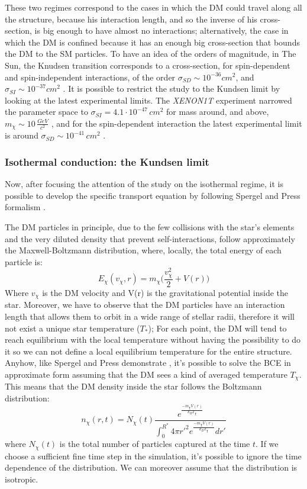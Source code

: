 These two regimes correspond to the cases in which the DM could travel along all the structure, because his interaction length, and so the inverse of his cross-section,  is big enough to have almost no interactions; alternatively, the case in which the DM is confined because it has an enough big cross-section that bounds the DM to the SM particles. To have an idea of the orders of magnitude, in The Sun, the Knudsen transition corresponds to a cross-section, for spin-dependent and spin-independent interactions, of the order $\sigma_{SD}\sim 10^{-36} cm^2$, and $\sigma_{SI}\sim 10^{-37} cm^2$ \cite{Banks_2022}. It is possible to restrict the study to the Kundsen limit by looking at the latest experimental limits. The \textit{XENON1T} experiment narrowed the parameter space to $\sigma_{SI}=4.1\cdot 10^{-47}\, cm^2$ for mass around, and above, $m_{\chi}\sim 10\, \frac{GeV}{c^2}$ \cite{Xenon_2018}, and for the spin-dependent interaction the latest experimental limit is around $\sigma_{SD}\sim 10^{-41}\, cm^2$ \cite{Schumann_2019}.

\subsubsection{Isothermal conduction: the Kundsen limit}
Now, after focusing the attention of the study on the isothermal regime, it is possible to develop the specific transport equation by following Spergel and Press formalism \cite{SpergelPress_Cond, Banks_2022, DMSun}. 

The DM particles in principle, due to the few collisions with the star's elements and the very diluted density that prevent self-interactions, follow approximately the Maxwell-Boltzmann distribution, where, locally, the total energy of each particle is:
\begin{equation*}
    E_{\chi}(v_{\chi},r)=m_{\chi}\Big(\frac{v_{\chi}^2}{2}+ V(r)\Big)
\end{equation*}
Where $v_{\chi}$ is the DM velocity and V(r) is the gravitational potential inside the star. Moreover, we have to observe that the DM particles have an interaction length that allows them to orbit in a wide range of stellar radii, therefore it will not exist a unique star temperature ($T_{*}$); For each point,  the DM will tend to reach equilibrium with the local temperature without having the possibility to do it so we can not define a local equilibrium temperature for the entire structure. 
 Anyhow, like Spergel and Press demonstrate \cite{SpergelPress_Cond}, it's possible to solve the BCE in approximate form assuming that the DM sees a kind of averaged temperature $T_{\chi}$.
This means that the DM density inside the star follows the Boltzmann distribution:
\begin{equation*}
    n_{\chi}(r,t)=N_{\chi}(t)\frac{e^{\frac{-m_{\chi}V(r)}{k_B T_{\chi}}}}{\int_0^{R^{*}} 4 \pi r'^2 e^{\frac{-m_{\chi}V(r)}{k_B T_{\chi}}} dr'}
\end{equation*}
where $N_{\chi}(t)$ is the total number of particles captured at the time $t$. If we choose a sufficient fine time step in the simulation, it's possible to ignore the time dependence of the distribution.
We can moreover assume that the distribution is isotropic.

